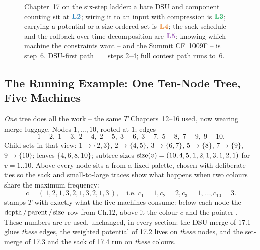 \begin{figure}[H]
\centering
{}
\caption*{Chapter~17 on the six-step ladder: a bare DSU and component
counting sit at \(\lv2\); wiring it to an input with compression is \(\lv3\);
carrying a potential or a size-ordered set is \(\lv4\); the sack schedule and
the rollback-over-time decomposition are \(\lv5\); knowing which machine the
constraints want -- and the Summit CF~1009F -- is step~6.  DSU-first path
\(=\) steps 2--4; full contest path runs to~6.}
\end{figure}

\subsection*{The Running Example: One Ten-Node Tree, Five Machines}

\emph{One} tree does all the work -- the same \(T\) Chapters~12--16 used,
now wearing merge luggage.  Nodes \(1,\dots,10\), rooted at \(1\); edges
\[
  1\!-\!2,\; 1\!-\!3,\; 2\!-\!4,\; 2\!-\!5,\; 3\!-\!6,\; 3\!-\!7,\; 5\!-\!8,\; 7\!-\!9,\; 9\!-\!10 .
\]
Child sets in that view: \(1\!\to\!\{2,3\}\), \(2\!\to\!\{4,5\}\),
\(3\!\to\!\{6,7\}\), \(5\!\to\!\{8\}\), \(7\!\to\!\{9\}\), \(9\!\to\!\{10\}\);
leaves \(\{4,6,8,10\}\); subtree sizes
\(\operatorname{size}(v)=(10,4,5,1,2,1,3,1,2,1)\) for \(v=1..10\).  Above every node sits a
 from a fixed palette, chosen with deliberate ties so the sack
and small-to-large traces show what happens when two colours share the maximum
frequency:
\[
  c=(\,1,2,1,3,2,1,3,2,1,3\,),\quad\text{i.e. } c_1=1,c_2=2,c_3=1,\dots,c_{10}=3 .
\]
 stamps \(T\) with exactly what the five machines consume:
below each node the \(\operatorname{depth}/\operatorname{parent}/\operatorname{size}\) row from Ch.12, above it the
colour \(c\) and the  pointer .  These
numbers are re-used, unchanged, in every section: the DSU merge of 17.1 glues
\emph{these} edges, the weighted potential of 17.2 lives on \emph{these}
nodes, and the set-merge of 17.3 and the sack of 17.4 run on \emph{these}
colours.


